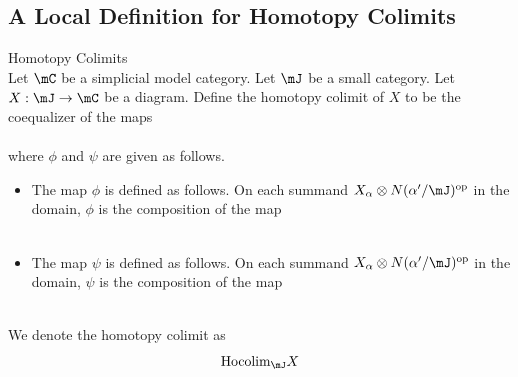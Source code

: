 \documentclass[a4paper]{article}
\begin{document}
\subsection{A Local Definition for Homotopy Colimits}
\begin{defn}{Homotopy Colimits}{}\\ Let $\mC$ be a simplicial model category. Let $\mJ$ be a small category. Let $X:\mJ\to\mC$ be a diagram. Define the homotopy colimit of $X$ to be the coequalizer of the maps \\
\\
where $\phi$ and $\psi$ are given as follows. 
\begin{itemize}
\item The map $\phi$ is defined as follows. On each summand $X_\alpha\otimes N(\alpha'/\mJ)^\text{op}$ in the domain, $\phi$ is the composition of the map \\
\\
\item The map $\psi$ is defined as follows. On each summand $X_\alpha\otimes N(\alpha'/\mJ)^\text{op}$ in the domain, $\psi$ is the composition of the map \\
\\
\end{itemize}
We denote the homotopy colimit as $$\text{Hocolim}_\mJ X$$
\end{defn}
\end{document}
